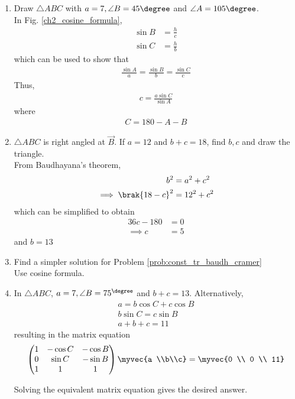 \begin{enumerate}[label=\arabic*.,ref=\thesubsection.\theenumi]
\item Draw $\triangle ABC$ with $a = 7, \angle B = 45\degree$ and $\angle A = 105 \degree$. 
\\
\solution In Fig. \eqref{ch2_cosine_formula},	
\begin{align}
\label{eq:sin_form_def}
\sin B &= \frac{h}{c}
\\
\sin C &= \frac{h}{b}
\end{align}
%
which can be used to show that
\begin{align}
\label{eq:sin_form}
\frac{\sin A}{a}=\frac{\sin B}{b}=\frac{\sin C}{c}
\end{align}
%
Thus, 
\begin{align}
c = \frac{a\sin C}{\sin A}
\end{align}
where
\begin{align}
C = 180-A-B
\end{align}
\item $\triangle ABC$ is right angled at $\vec{B}$.  If $a = 12$ and $b+c = 18$, find $b,c$ and draw the triangle.
\\
\solution From Baudhayana's theorem, 
\begin{align}
b^2 &= a^2 + c^2
\\
\implies \brak{18-c}^2 &= 12^2 +c^2
\end{align}
which can be simplified to obtain
\begin{align}
 36c -180&= 0
\\
\implies c&=5
\end{align}
%
and $b = 13$
\item Find a simpler solution for  Problem \ref{prob:const_tr_baudh_cramer} 
\\
\solution Use cosine formula.
\item In $\triangle ABC$,  $a = 7, \angle B = 75^{\degree}$ and $b+c = 13$. 
Alternatively, 
\begin{align}
a = b \cos C + c \cos B
\\
b \sin C = c \sin B
\\
a + b+c = 11
\end{align}
%
resulting  in the matrix equation 
\begin{align}
\begin{pmatrix}
1 & -\cos C & - \cos B
\\
0 & \sin C &- \sin B
\\
1 & 1 & 1
\end{pmatrix}
\myvec{a \\b\\c} = \myvec{0 \\ 0 \\ 11}
\end{align}

Solving the equivalent matrix equation gives the desired answer.

\end{enumerate}
%
